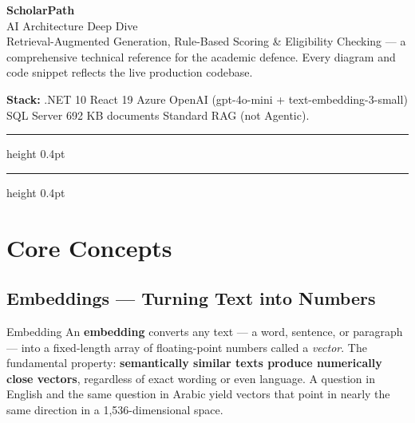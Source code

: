 \documentclass[11pt,a4paper]{article}
\begin{document}

\begin{tcolorbox}[colback=spPrimary,colframe=spPrimary,arc=4pt,boxrule=0pt]
  \color{white}
  {\Huge\bfseries ScholarPath}\\[3pt]
  {\LARGE AI Architecture Deep Dive}\\[8pt]
  {\normalsize Retrieval-Augmented Generation, Rule-Based Scoring \& Eligibility
  Checking --- a comprehensive technical reference for the academic defence.
  Every diagram and code snippet reflects the live production codebase.}
\end{tcolorbox}

\vspace{4pt}
{\small\color{spInk}
\textbf{Stack:} .NET 10 \textperiodcentered{} React 19 \textperiodcentered{}
Azure OpenAI (gpt-4o-mini + text-embedding-3-small) \textperiodcentered{}
SQL Server \textperiodcentered{} 692 KB documents \textperiodcentered{}
Standard RAG (not Agentic).}

\vspace{2pt}\hrule height 0.4pt\vspace{6pt}
{\small\tableofcontents}
\vspace{4pt}\hrule height 0.4pt

\newpage

\section{Core Concepts}

\subsection{Embeddings --- Turning Text into Numbers}

\begin{conceptbox}{Embedding}
An \textbf{embedding} converts any text --- a word, sentence, or paragraph ---
into a fixed-length array of floating-point numbers called a \emph{vector}.
The fundamental property: \textbf{semantically similar texts produce numerically
close vectors}, regardless of exact wording or even language.
A question in English and the same question in Arabic yield vectors that point
in nearly the same direction in a 1,536-dimensional space.
\end{conceptbox}
\end{document}
